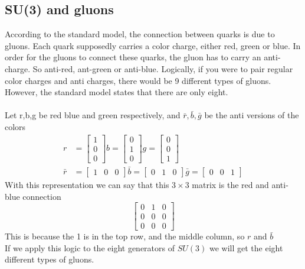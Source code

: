 \documentclass[12pt]{article}
\begin{document}
\subsection{SU(3) and gluons}
According to the standard model, the connection between quarks is due to gluons. Each quark supposedly carries a color charge, either red, green or blue. In order for the gluons to connect these quarks, the gluon has to carry an anti-charge. So anti-red, ant-green or anti-blue. Logically, if you were to pair regular color charges and anti charges, there would be 9 different types of gluons. However, the standard model states that there are only eight.\\\\
Let r,b,g be red blue and green respectively, and $\bar{r}, \bar{b}, \bar{g}$ be the anti versions of the colors
\begin{align*}
	r &= \left[ \begin{matrix}
	1\\ 0\\ 0
	\end{matrix} \right]
	b = \left[ \begin{matrix}
	0\\ 1\\ 0
	\end{matrix} \right]
	g = \left[ \begin{matrix}
	0\\ 0\\ 1
	\end{matrix} \right] \\
	\bar{r} &= \left[ \begin{matrix}
	1 & 0 & 0
	\end{matrix} \right]
	\bar{b} = \left[ \begin{matrix}
	0 & 1 & 0
	\end{matrix} \right]
	\bar{g} = \left[ \begin{matrix}
	0 & 0 & 1
	\end{matrix} \right]
\end{align*}
With this representation we can say that this $3 \times 3$ matrix is the red and anti-blue connection
\[
	\left[ \begin{matrix}
	0 & 1 & 0\\
	0 & 0 & 0\\
	0 & 0 & 0
	\end{matrix} \right]
\]
This is because the 1 is in the top row, and the middle column, so $r$ and $\bar{b}$\\
If we apply this logic to the eight generators of $SU(3)$ we will get the eight different types of gluons.
\end{document}
